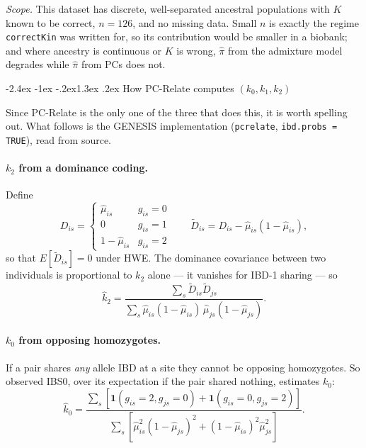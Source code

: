 \documentclass[10pt,a4paper]{article}
\makeatletter
\renewcommand\section{\@startsection{section}{1}{\z@}%
  {-2.4ex \@plus -1ex \@minus -.2ex}{1.3ex \@plus.2ex}%
  {\normalfont\large\bfseries\color{hdr}}}
\makeatother
\begin{document}
\noindent
\emph{Scope.} This dataset has discrete, well-separated ancestral populations with $K$ known to be correct,
$n=126$, and no missing data. Small $n$ is exactly the regime \texttt{correctKin} was written for, so its
contribution would be smaller in a biobank; and where ancestry is continuous or $K$ is wrong, $\hat\pi$ from
the admixture model degrades while $\hat\pi$ from PCs does not.

\section{How PC-Relate computes $(k_0,k_1,k_2)$}
\label{sec:ibd}

Since PC-Relate is the only one of the three that does this, it is worth spelling out. What follows is the
GENESIS implementation (\texttt{pcrelate}, \texttt{ibd.probs = TRUE}), read from source.

\paragraph{$k_2$ from a dominance coding.} Define
\begin{equation*}
D_{is}=\begin{cases}\hat\mu_{is} & g_{is}=0\\[1pt] 0 & g_{is}=1\\[1pt] 1-\hat\mu_{is} & g_{is}=2\end{cases}
\qquad
\tilde D_{is}=D_{is}-\hat\mu_{is}(1-\hat\mu_{is}),
\end{equation*}
so that $E[\tilde D_{is}]=0$ under HWE. The dominance covariance between two individuals is proportional to
$k_2$ alone --- it vanishes for IBD-1 sharing --- so
\begin{equation*}
\hat k_2=\frac{\sum_s \tilde D_{is}\tilde D_{js}}
{\sum_s \hat\mu_{is}(1-\hat\mu_{is})\,\hat\mu_{js}(1-\hat\mu_{js})}.
\end{equation*}

\paragraph{$k_0$ from opposing homozygotes.} If a pair shares \emph{any} allele IBD at a site they cannot be
opposing homozygotes. So observed IBS0, over its expectation if the pair shared nothing, estimates $k_0$:
\begin{equation*}
\hat k_0=\frac{\sum_s\left[\mathbf{1}(g_{is}{=}2,g_{js}{=}0)+\mathbf{1}(g_{is}{=}0,g_{js}{=}2)\right]}
{\sum_s\left[\hat\mu_{is}^{2}(1-\hat\mu_{js})^{2}+(1-\hat\mu_{is})^{2}\hat\mu_{js}^{2}\right]}.
\end{equation*}
\end{document}
